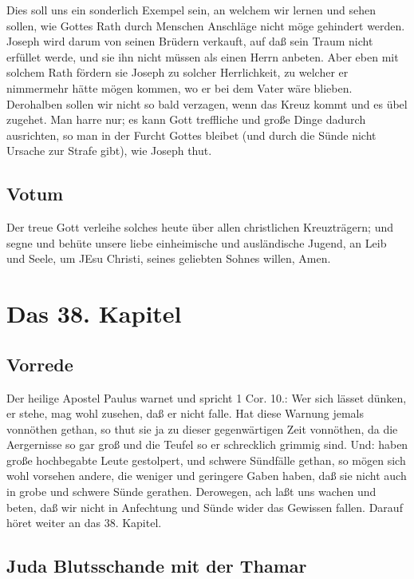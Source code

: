 Dies soll uns ein sonderlich Exempel sein, an welchem wir lernen und sehen sollen, wie Gottes Rath durch Menschen Anschläge nicht möge gehindert werden. Joseph wird darum von seinen Brüdern verkauft, auf daß sein Traum nicht erfüllet werde, und sie ihn nicht müssen als einen Herrn anbeten. Aber eben mit solchem Rath fördern sie Joseph zu solcher Herrlichkeit, zu welcher er nimmermehr hätte mögen kommen, wo er bei dem Vater wäre blieben. Derohalben sollen wir nicht so bald verzagen, wenn das Kreuz kommt und es übel zugehet. Man harre nur; es kann Gott treffliche und große Dinge dadurch ausrichten, so man in der Furcht Gottes bleibet (und durch die Sünde nicht Ursache zur Strafe gibt), wie Joseph thut.

\section{Votum}

Der treue Gott verleihe solches heute über allen christlichen Kreuzträgern; und segne und behüte unsere liebe einheimische und ausländische Jugend, an Leib und Seele, um JEsu Christi, seines geliebten Sohnes willen, Amen.

\chapter{Das 38. Kapitel}

\section{Vorrede}

Der heilige Apostel Paulus warnet und spricht 1 Cor. 10.: Wer sich lässet dünken, er stehe, mag wohl zusehen, daß er nicht falle. Hat diese Warnung jemals vonnöthen gethan, so thut sie ja zu dieser gegenwärtigen Zeit vonnöthen, da die Aergernisse so gar groß und die Teufel so er
schrecklich grimmig sind. Und: haben große hochbegabte Leute gestolpert, und schwere Sündfälle gethan, so mögen sich wohl vorsehen andere, die weniger und geringere Gaben haben, daß sie nicht auch in grobe und schwere Sünde gerathen. Derowegen, ach laßt uns wachen und beten, daß wir nicht in Anfechtung und Sünde wider das Gewissen fallen. Darauf höret weiter an das 38. Kapitel.

\section{Juda Blutsschande mit der Thamar}

